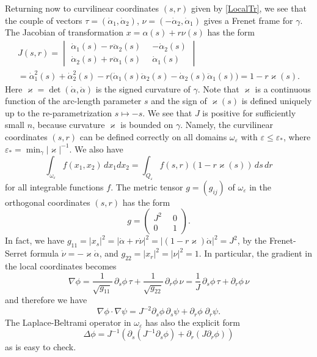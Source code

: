 \documentclass[reqno]{amsart}
\theoremstyle{plain}
\numberwithin{equation}{section}
\renewcommand{\kappa}{\varkappa}
\newcommand{\eps}{\varepsilon}
\renewcommand{\leq}{\leqslant}
\begin{document}
Returning now to curvilinear coordinates $(s,r)$ given by \eqref{LocalTr},
we see that the couple of vectors
$ \tau=(\dot{\alpha}_1, \dot{\alpha}_2)$, $\nu=(-\dot{\alpha}_2, \dot{\alpha}_1)$
gives a Frenet frame for $\gamma$.
The Jacobian of transformation $x=\alpha(s)+r\nu(s)$ has the form
\begin{multline*}
J(s,r)=
\begin{vmatrix}
  \dot{\alpha}_1(s)-r\ddot{\alpha}_2(s)& -\dot{\alpha}_2(s)\\
          \dot{\alpha}_2(s)+r\ddot{\alpha}_1(s)\phantom{0} & \dot{\alpha}_1(s)
\end{vmatrix}
\\
=\dot{\alpha}_1^2(s)+\dot{\alpha}_2^2(s)
-r\big(\dot{\alpha}_1(s)\ddot{\alpha}_2(s)-
  \dot{\alpha}_2(s)\ddot{\alpha}_1(s)\big)=1-r \kappa(s).
\end{multline*}
Here $\kappa=\det(\dot{\alpha},\ddot{\alpha})$ is the signed curvature of $\gamma$. Note that $\kappa$ is a continuous function
of the arc-length parameter $s$ and the sign of $\kappa(s)$ is defined uniquely up to the re-parametrization $s\mapsto-s$.
We see that $J$ is positive for sufficiently small $n$, because  curvature $\kappa$  is  bounded on $\gamma$.
Namely, the curvilinear coordinates $(s,r)$ can be defined correctly on all domains $\omega_\eps$ with $\eps\leq \eps_*$, where
$\eps_*=\min_{\gamma}|\kappa|^{-1}$.
We also have
\begin{equation}\label{IntegralCh}
  \int_{\omega_\eps} f(x_1,x_2)\,dx_1dx_2=\int_{Q_\eps} f(s,r)(1-r\kappa(s))\,ds\,dr
\end{equation}
for all integrable functions $f$.
The metric tensor $g=(g_{ij})$ of $\omega_\eps$ in the orthogonal coordinates $(s,r)$  has the form
  \begin{equation*}
    g=
    \begin{pmatrix}
      J^2\phantom{0} & 0 \\
          0\phantom{0} & 1
    \end{pmatrix}.
  \end{equation*}
In fact, we have
$g_{11}=|x_s|^2=|\dot{\alpha}+r \dot{\nu}|^2
=|(1-r\kappa) \dot{\alpha}|^2=J^2$,
by the Frenet-Serret formula $\dot{\nu}=-\kappa \dot{\alpha}$, and $g_{22}=|x_r|^2=|\nu|^2=1$.
In particular,  the gradient in the local coordinates becomes
\begin{equation*}
 \nabla \phi=\frac1{\sqrt{g_{11}}}\,\partial_s\phi\, \tau+\frac1{\sqrt{g_{22}}}\,\partial_r\phi\, \nu=\frac1J\,\partial_s\phi\, \tau+\partial_r\phi\, \nu
\end{equation*}
and  therefore we have
\begin{equation}\label{ScalarProdGrads}
  \nabla \phi\cdot \nabla \psi=J^{-2}\partial_s\phi\, \partial_s \psi+
\partial_r \phi\; \partial_r \psi.
\end{equation}
The Laplace-Beltrami operator in $\omega_\eps$ has also the explicit form
\begin{equation}\label{LaplacianInSN}
\Delta \phi=J^{-1}\left(\partial_s(J^{-1}\partial_s \phi)+ \partial_r(J\partial_r \phi)\right)
\end{equation}
as is easy to check.
\end{document}
